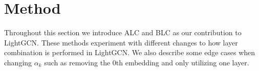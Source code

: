 \section{Method}
Throughout this section we introduce ALC and BLC as our contribution to LightGCN.
These methods experiment with different changes to how layer combination is performed in LightGCN.
We also describe some edge cases when changing $\alpha_k$ such as removing the 0th embedding and only utilizing one layer.




